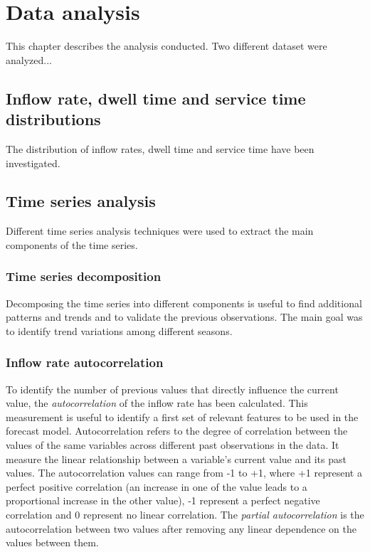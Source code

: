 \chapter{Data analysis}
\label{cha:data_analysis}

This chapter describes the analysis conducted.
Two different dataset were analyzed...


\section{Inflow rate, dwell time and service time distributions}
\label{sec:rates_distributions}
The distribution of inflow rates, dwell time and service time have been investigated.

\section{Time series analysis}
\label{sec:time_series_analysis}
Different time series analysis techniques were used to extract the main components of the time series.

\subsection{Time series decomposition}
\label{subsec:time_series_decomposition}
Decomposing the time series into different components is useful to find additional patterns and trends and to validate the previous observations. The main goal was to identify trend variations among different seasons.

\subsection{Inflow rate autocorrelation}
\label{subsec:autocorrelation}
To identify the number of previous values that directly influence the current value, the \emph{autocorrelation} of the inflow rate has been calculated. This measurement is useful to identify a first set of relevant features to be used in the forecast model.
Autocorrelation refers to the degree of correlation between the values of the same variables across different past observations in the data. It measure the linear relationship between a variable's current value and its past values. The autocorrelation values can range from -1 to +1, where +1 represent a perfect positive correlation (an increase in one of the value leads to a proportional increase in the other value), -1 represent a perfect negative correlation and 0 represent no linear correlation.
The \emph{partial autocorrelation} is the autocorrelation between two values after removing any linear dependence on the values between them.

